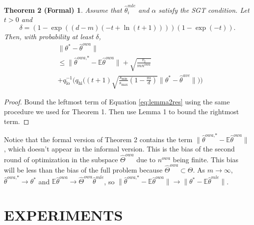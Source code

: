 \documentclass[twoside]{article}
\DeclareMathOperator*{\argmin}{arg\,min}
\newcommand{\smin}{s_\text{min}}
\newcommand{\smax}{s_\text{max}}
\newcommand{\qhi}{q_\text{hi}}
\newcommand{\qlo}{q_\text{lo}}
\newcommand{\nowa}{n^{\textit{owa}}}
\newcommand{\Y}{\mathcal{Y}}
\newcommand{\X}{\mathcal{X}}
\newcommand{\W}{{\hat \Theta^{\textit{owa}}}}
\newcommand{\Wowa}{{\hat \Theta^{\textit{owa}}}}
\newcommand{\E}{\mathbb{E}}
\newcommand{\x}{\mathbf{x}}
\newcommand{\w}{\theta}
\newcommand{\astar}{\alpha^*}
\newcommand{\wowa}{\hat\w^{owa}}
\newcommand{\wowastar}{\hat\w^{\textit{owa,*}}}
\newcommand{\wave}{\hat\w^{ave}}
\newcommand{\wmle}{\hat\w^{mle}}
\newcommand{\wstar}{{\w^{*}}}
\newcommand{\trans}[1]{\ensuremath{{#1}^{\mathsf{T}}}}
\newcommand{\ltwo}[1]{{\lVert {#1} \rVert}}
\begin{document}

\newtheorem*{theoremformal}{Theorem 2 (Formal)}
\begin{theoremformal}
Assume that $\wmle_i$ and $\alpha$ satisfy the SGT condition.
Let $t>0$ and
\begin{equation}
\delta = (1-\exp((d-m)(-t+\ln(t+1))))(1-\exp(-t))
.
\end{equation}
Then, with probability at least $\delta$,
\begin{equation}
\begin{aligned}
&\ltwo{\wstar-\wowa}
\\
&\le
\ltwo{\wowastar-\E\wowa}
+ \sqrt{\frac{v_t}{m\nowa}}
\\
&+
\qlo^{-1}\bigg(\qhi\bigg((t+1)\sqrt{\frac{\smin}{\smax}\left(1-\frac{m}{d}\right)}\ltwo{\wstar-\wave}\bigg)\bigg)
\end{aligned}
\end{equation}
\end{theoremformal}

\begin{proof}
Bound the leftmost term of Equation \ref{eq:lemma2res} using the same procedure we used for Theorem 1.
Then use Lemma 1 to bound the rightmost term.
\end{proof}

\newpage

Notice that the formal version of Theorem 2 contains the term $\ltwo{\wowastar-\E\wowa}$, which doesn't appear in the informal version.
This is the bias of the second round of optimization in the subspace $\Wowa$ due to $\nowa$ being finite.
This bias will be less than the bias of the full problem because $\Wowa\subset\Theta$.
As $m\to\infty$, $\wowastar\to\wstar$ and $\E\wowa\to\W\wmle$, so $\ltwo{\wowastar-\E\wowa}\to\ltwo{\wstar-\E\wmle}$.

\section{EXPERIMENTS}
\label{sec:exp}
\end{document}
